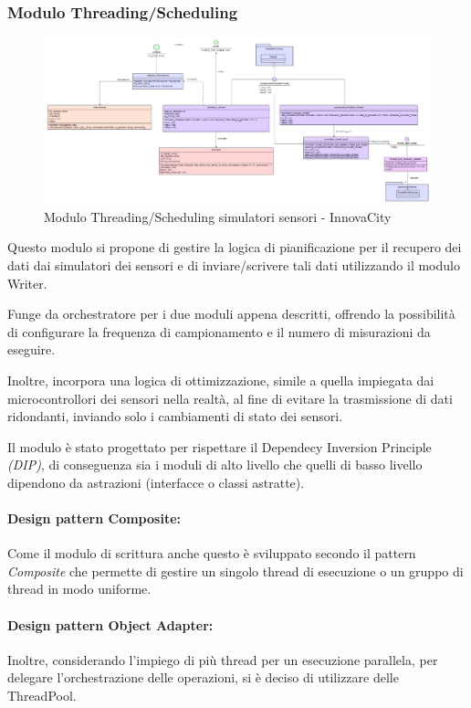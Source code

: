 \subsubsection{Modulo Threading/Scheduling}
\begin{figure}[H]
    \centering
    \includegraphics[width=1.1\textwidth]{../Images/SpecificaTecnica/simulatorThread.PNG}
    \caption{Modulo Threading/Scheduling simulatori sensori - InnovaCity}
    \label{fig: Modulo_simulatori_sensori_thread}
\end{figure}
Questo modulo si propone di gestire la logica di pianificazione per il recupero dei dati dai simulatori dei sensori e di inviare/scrivere tali dati utilizzando il modulo Writer.

Funge da orchestratore per i due moduli appena descritti, offrendo la possibilità di configurare la frequenza di campionamento e il numero di misurazioni da eseguire.

Inoltre, incorpora una logica di ottimizzazione, simile a quella impiegata dai microcontrollori dei sensori nella realtà, al fine di evitare la trasmissione di dati ridondanti, inviando solo i cambiamenti di stato dei sensori.

Il modulo è stato progettato per rispettare il Dependecy Inversion Principle \textit{(DIP)}, di conseguenza sia i moduli di alto livello che quelli di basso livello dipendono da astrazioni (interfacce o classi astratte).

\paragraph{Design pattern Composite:}
Come il modulo di scrittura anche questo è sviluppato secondo il pattern \textit{Composite} che permette di gestire un singolo thread di esecuzione o un gruppo di thread in modo uniforme.

\paragraph{Design pattern Object Adapter:}
Inoltre, considerando l'impiego di più thread per un esecuzione parallela, per delegare l'orchestrazione delle operazioni, si è deciso di utilizzare delle ThreadPool.

